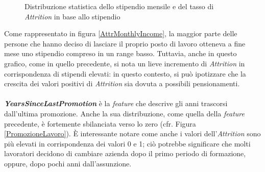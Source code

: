 \begin{figure}[H]
	\centering
	\quad
	\caption{Distribuzione statistica dello stipendio mensile e del tasso di \textit{Attrition} in base allo stipendio}
	\label{GraficiStipendio}
\end{figure}
\noindent Come rappresentato in figura \ref{AttrMonthlyIncome}, la maggior parte delle persone che hanno deciso di lasciare il proprio posto di lavoro otteneva a fine mese uno stipendio compreso in un range basso. Tuttavia, anche in questo grafico, come in quello precedente, si nota un lieve incremento di \textit{Attrition} in corrispondenza di stipendi elevati: in questo contesto, si può ipotizzare che la crescita dei valori positivi di \textit{Attrition} sia dovuta a possibili pensionamenti.
\\\\
\textbf{\textit{YearsSinceLastPromotion}} è la \textit{\textit{feature}} che descrive gli anni trascorsi dall'ultima promozione. Anche la sua distribuzione, come quella della \textit{\textit{feature}} precedente, è fortemente sbilanciata verso lo zero (cfr. Figura \ref{PromozioneLavoro}). È interessante notare come anche i valori dell'\textit{Attrition} sono più elevati in corrispondenza dei valori 0 e 1; ciò potrebbe significare che molti lavoratori decidono di cambiare azienda dopo il primo periodo di formazione, oppure, dopo pochi anni dall'assunzione.\\\\
